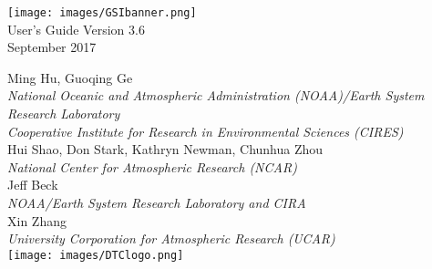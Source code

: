 \begin{titlepage}
{}
\noindent
   \begin{center}     

      \texttt{[image: images/GSIbanner.png]}\\[2em]
     {\color{darkcerulean}
        \Huge{User's Guide Version 3.6}\\[1em]       
        \normalsize{September 2017}\\[5em] 
       }
 
      \normalsize{Ming Hu, Guoqing Ge}\\ 
      \textit{\small{National Oceanic and Atmospheric Administration (NOAA)/Earth System Research Laboratory}}\\
      \textit{\small{Cooperative Institute for Research in Environmental Sciences (CIRES)}}\\[2em]
      \normalsize{Hui Shao, Don Stark, Kathryn Newman, Chunhua Zhou}\\
      \textit{\small{National Center for Atmospheric Research (NCAR)}}\\[2em]
      \normalsize{Jeff Beck}\\
      \textit{\small{NOAA/Earth System Research Laboratory and CIRA}}\\[2em]   
      \normalsize{Xin Zhang}\\
      \textit{\small{University Corporation for Atmospheric Research (UCAR)}}\\[2em]
 
       \texttt{[image: images/DTClogo.png]}\\
         
      \vspace{1em}

   \end{center}
   \restoregeometry
\end{titlepage}
\pagebreak{}




